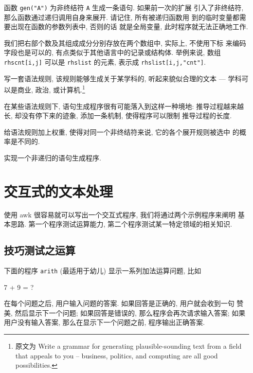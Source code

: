 函数 \texttt{gen("A")} 为非终结符 \texttt{A} 生成一条语句. 如果前一次的扩展
引入了非终结符, 那么函数通过递归调用自身来展开. 请记住, 所有被递归函数用%
%
到的临时变量都需要出现在函数的参数列表中, 否则的话
就是全局变量, 此时程序就无法正确地工作.

我们把右部个数及其组成成分分别存放在两个数组中, 实际上, 不使用下标
来编码字段也是可以的, 有点类似于其他语言中的记录或结构体. 
举例来说, 数组 \texttt{rhscnt[i,j]} 可以是 \texttt{rhslist} 的元素,
表示成 \texttt{rhslist[i,j,"cnt"]}.

\begin{exercise}
    写一套语法规则, 该规则能够生成关于某学科的, 听起来貌似合理的文本 ---
    学科可以是商业, 政治, 或计算机.\footnote{原文为 Write a grammar for
        generating plausible-sounding text from a field that appeals to you
    -- business, politics, and computing are all good possibilities.}
\end{exercise}

\begin{exercise}
    \label{exer:length_limit}
    在某些语法规则下, 语句生成程序很有可能落入到这样一种境地:
    推导过程越来越长, 却没有停下来的迹象, 添加一条机制, 使得程序可以限制
    推导过程的长度.
\end{exercise}

\begin{exercise}
    \label{exer:weight}
    给语法规则加上权重, 使得对同一个非终结符来说, 它的各个展开规则被选中
    的概率是不同的.
\end{exercise}

\begin{exercise}
    \label{exer:nonrecursive}
    实现一个非递归的语句生成程序.
\end{exercise}

\section{交互式的文本处理}
\label{sec:interactive_text_manipulation}

使用 awk 很容易就可以写出一个交互式程序, 我们将通过两个示例程序来阐明
基本思路. 第一个程序测试运算能力, 第二个程序测试某一特定领域的相关知识.

\subsection{技巧测试之运算}
\label{subsec:skills_testing_arithmetic}

下面的程序 \texttt{arith} (最适用于幼儿) 显示一系列加法运算问题, 比如
\begin{awkcode}
    7 + 9 = ?
\end{awkcode}
在每个问题之后, 用户输入问题的答案. 如果回答是正确的, 用户就会收到一句
赞美, 然后显示下一个问题; 如果回答是错误的, 那么程序会再次请求输入答案;
如果用户没有输入答案, 那么在显示下一个问题之前, 程序输出正确答案.

